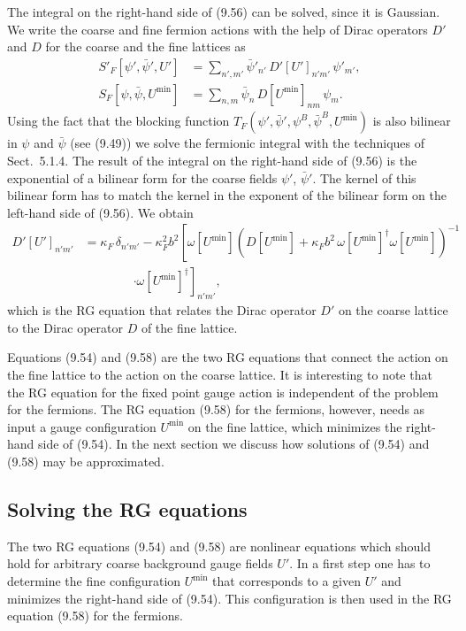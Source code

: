 The integral on the right-hand side of (9.56) can be solved, since it is
Gaussian. We write the coarse and fine fermion actions with the help of Dirac
operators $D'$ and $D$ for the coarse and the fine lattices as
\begin{align}
  S'_F[\psi',\bar\psi',U'] &= \sum_{n',m'}\bar\psi'_{n'}\,D'[U']_{n'm'}\,\psi'_{m'} , \nonumber\\
  S_F[\psi,\bar\psi,U^{\min}] &= \sum_{n,m}\bar\psi_n\,D[U^{\min}]_{nm}\,\psi_m .
\end{align}
Using the fact that the blocking function $T_F(\psi',\bar\psi',\psi^B,\bar\psi^B,
U^{\min})$ is also bilinear in $\psi$ and $\bar\psi$ (see (9.49)) we solve the
fermionic integral with the techniques of Sect.~5.1.4. The result of the
integral on the right-hand side of (9.56) is the exponential of a bilinear
form for the coarse fields $\psi'$, $\bar\psi'$. The kernel of this bilinear
form has to match the kernel in the exponent of the bilinear form on the
left-hand side of (9.56). We obtain
\begin{equation}
  \begin{split}
    D'[U']_{n'm'}
    &= \kappa_F\,\delta_{n'm'}
       - \kappa_F^2 b^2\left[\omega[U^{\min}]
         \left(D[U^{\min}] + \kappa_F b^2\,\omega[U^{\min}]^\dagger
         \omega[U^{\min}]\right)^{-1}\right. \\
    &\qquad\qquad \left.\cdot \omega[U^{\min}]^\dagger\right]_{n'm'} ,
  \end{split}
\end{equation}
which is the RG equation that relates the Dirac operator $D'$ on the coarse
lattice to the Dirac operator $D$ of the fine lattice.

Equations (9.54) and (9.58) are the two RG equations that connect the action
on the fine lattice to the action on the coarse lattice. It is interesting to
note that the RG equation for the fixed point gauge action is independent of
the problem for the fermions. The RG equation (9.58) for the fermions,
however, needs as input a gauge configuration $U^{\min}$ on the fine lattice,
which minimizes the right-hand side of (9.54). In the next section we discuss
how solutions of (9.54) and (9.58) may be approximated.

\subsection{Solving the RG equations}
\label{sec:9.3.4}

The two RG equations (9.54) and (9.58) are nonlinear equations which should
hold for arbitrary coarse background gauge fields $U'$. In a first step one has
to determine the fine configuration $U^{\min}$ that corresponds to a given
$U'$ and minimizes the right-hand side of (9.54). This configuration is then
used in the RG equation (9.58) for the fermions.

